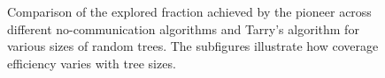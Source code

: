 \begin{figure}[H]
    \centering
    \qquad
    \qquad
    \newline
    \qquad
    \newline
    \caption{Comparison of the explored fraction achieved by the pioneer across different no-communication algorithms and Tarry's algorithm for various sizes of random trees. The subfigures illustrate how coverage efficiency varies with tree sizes.}
    \label{fig_no_comm_fraction_all_sizes_tree}
\end{figure}

